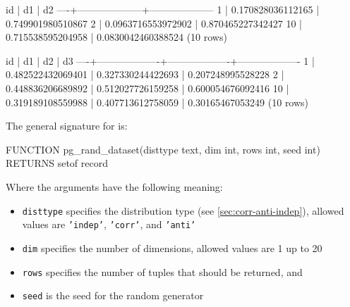 \begin{interactive}
 id |         d1         |         d2
----+--------------------+--------------------
  1 |  0.170828036112165 |  0.749901980510867
  2 | 0.0963716553972902 |  0.870465227342427
\ellipsis{}
 10 |  0.715538595204958 | 0.0830042460388524
(10 rows)

 id |        d1         |        d2         |        d3
----+-------------------+-------------------+-------------------
  1 | 0.482522432069401 | 0.327330244422693 | 0.207248995528228
  2 | 0.448836206689892 | 0.512027726159258 | 0.600054676092416
\ellipsis{}
 10 | 0.319189108559988 | 0.407713612758059 |  0.30165467053249
(10 rows)

\end{interactive}

\noindent
The general signature for  is:
\begin{interactive}
FUNCTION pg_rand_dataset(disttype text, dim int, rows int, seed int)
RETURNS setof record
\end{interactive}

\noindent
Where the arguments have the following meaning:
\begin{itemize}
\item \texttt{disttype} 
specifies the distribution type (see \autoref{sec:corr-anti-indep}),
allowed values are \texttt{'indep'}, \texttt{'corr'}, and
\texttt{'anti'}

\item \texttt{dim} specifies the number of dimensions, allowed values are 1 up to 20 

\item \texttt{rows} specifies the number of tuples that should be returned, and 

\item \texttt{seed} is the seed for the random generator
\end{itemize}

